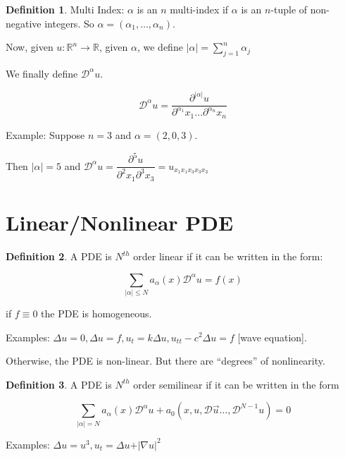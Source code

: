 \documentclass{article}
\theoremstyle{definition}
\newtheorem{definition}{Definition}
\begin{document}
\begin{definition}
    Multi Index: \(\alpha \) is an \(n\) multi-index if \(\alpha \) is an \(n\)-tuple of non-negative integers. So \(\alpha =(\alpha_1, \dots, \alpha_n )\).

    Now, given \(u:\mathbb{R} ^n\to \mathbb{R} \), given \(\alpha \), we define \(\vert \alpha  \vert = \displaystyle \sum_{j=1}^{n} \alpha _{j} \) 

    We finally define \(\mathcal{D} ^\alpha u\).

    \[
        \mathcal{D} ^\alpha u=\frac{\partial^{\vert \alpha  \vert } u}{\partial^{\alpha_1}x_1 \dots \partial^{\alpha _{n}}x_{n} } 
    \]

\end{definition}

Example: Suppose \(n=3\) and \(\alpha =(2,0,3)\).

Then \(\vert \alpha  \vert = 5\) and \(\mathcal{D} ^\alpha u=\dfrac{\partial ^5 u}{\partial ^2 x_1 \partial ^3 x_3} = u_{x_1 x_1 x_3 x_3 x_3}\) 

\section*{Linear/Nonlinear PDE}

\begin{definition}
    A PDE is \(N^{th}\) order linear if it can be written in the form:

    \[
        \sum_{\vert \alpha  \vert \leq N} a_\alpha (x)\mathcal{D} ^\alpha u = f(x)
    \]

    if \(f\equiv 0\) the PDE is homogeneous.

    Examples: \(\Delta u=0,\Delta u=f,u_{t} =k \Delta u, u_{tt} - c^2 \Delta u=f\) [wave equation].
    
\end{definition}

Otherwise, the PDE is non-linear. But there are ``degrees'' of nonlinearity.

\begin{definition}
    A PDE is \(N^{th} \) order semilinear if it can be written in the form

    \[
        \sum_{\vert \alpha  \vert = N} a_\alpha (x)\mathcal{D} ^\alpha u + a_0(x,u,\mathcal{D} \vec{u} \dots ,\mathcal{D} ^{N-1}u) = 0
    \]

\end{definition}

Examples: \(\Delta u=u^3,u_{t} =\Delta u+\vert \nabla u \vert ^2\) 
\end{document}
